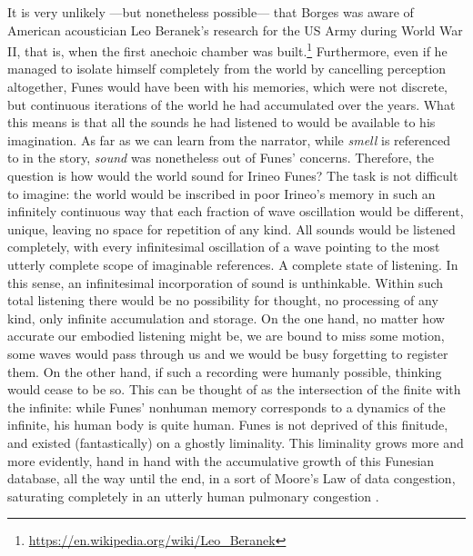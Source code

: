 It is very unlikely ---but nonetheless possible--- that Borges was aware of American acoustician Leo Beranek's research for the US Army during World War II, that is, when the first anechoic chamber was built.\footnote{\url{https://en.wikipedia.org/wiki/Leo_Beranek}} Furthermore, even if he managed to isolate himself completely from the world by cancelling perception altogether, Funes would have been with his memories, which were not discrete, but continuous iterations of the world he had accumulated over the years. What this means is that all the sounds he had listened to would be available to his imagination. As far as we can learn from the narrator, while \textit{smell} is referenced to in the story, \textit{sound} was nonetheless out of Funes' concerns. Therefore, the question is how would the world sound for Irineo Funes? The task is not difficult to imagine: the world would be inscribed in poor Irineo's memory in such an infinitely continuous way that each fraction of wave oscillation would be different, unique, leaving no space for repetition of any kind. All sounds would be listened completely, with every infinitesimal oscillation of a wave pointing to the most utterly complete scope of imaginable references. A complete state of listening. In this sense, an infinitesimal incorporation of sound is unthinkable. Within such total listening there would be no possibility for thought, no processing of any kind, only infinite accumulation and storage. On the one hand, no matter how accurate our embodied listening might be, we are bound to miss some motion, some waves would pass through us and we would be busy forgetting to register them. On the other hand, if such a recording were humanly possible, thinking would cease to be so. This can be thought of as the intersection of the finite with the infinite: while Funes' nonhuman memory corresponds to a dynamics of the infinite, his human body is quite human. Funes is not deprived of this finitude, and existed (fantastically) on a ghostly liminality. This liminality grows more and more evidently, hand in hand with the accumulative growth of this Funesian database, all the way until the end, in a sort of Moore's Law of data congestion, saturating completely in an utterly human pulmonary congestion \parencite{Ovi19:Mem}.

